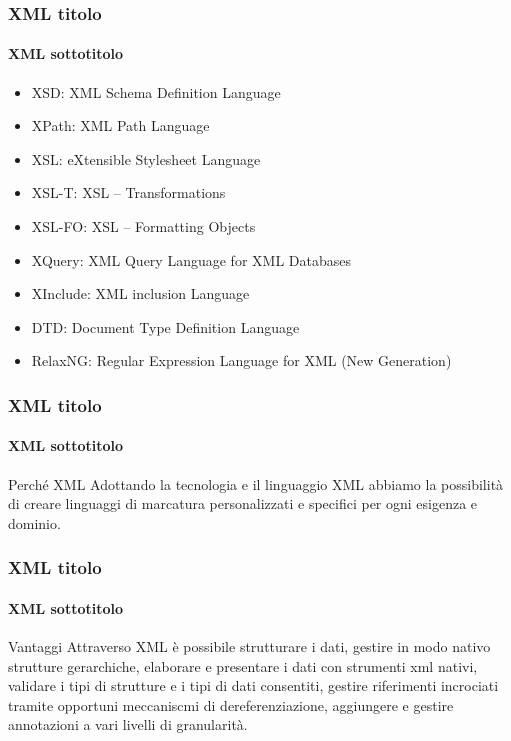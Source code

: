 \begin{frame}
	\frametitle{XML titolo}
	\framesubtitle{XML sottotitolo}
	\addtocounter{nframe}{1}

	\begin{itemize}
		\item XSD: XML Schema Definition Language
		\item XPath: XML Path Language
		\item XSL: eXtensible Stylesheet Language
		\item XSL-T:  XSL – Transformations
		\item XSL-FO: XSL – Formatting Objects
		\item XQuery: XML Query Language for XML Databases
		\item XInclude: XML inclusion Language
		\item DTD: Document Type Definition Language
		\item RelaxNG: Regular Expression Language for XML (New Generation)
	\end{itemize}

\end{frame}


\begin{frame}
	\frametitle{XML titolo}
	\framesubtitle{XML sottotitolo}
	\addtocounter{nframe}{1}

	\begin{block}{Perché XML}
		Adottando la tecnologia e il linguaggio XML abbiamo la possibilità di creare linguaggi di marcatura personalizzati e specifici per ogni esigenza e dominio.
	\end{block}

\end{frame}

\begin{frame}
	\frametitle{XML titolo}
	\framesubtitle{XML sottotitolo}
	\addtocounter{nframe}{1}

	\begin{block}{Vantaggi}
		Attraverso XML è possibile strutturare i dati, gestire in modo nativo strutture gerarchiche, elaborare e presentare i dati con strumenti xml nativi, validare i tipi di strutture e i tipi di dati consentiti, gestire riferimenti incrociati tramite opportuni meccaniscmi di dereferenziazione, aggiungere e gestire annotazioni a vari livelli di granularità.
	\end{block}


\end{frame}


